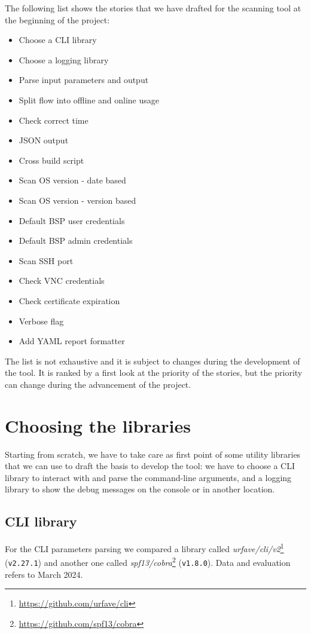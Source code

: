 The following list shows the stories that we have drafted for the scanning tool at the beginning of the project:
\begin{itemize}
  \item Choose a CLI library
  \item Choose a logging library
  \item Parse input parameters and output
  \item Split flow into offline and online usage
  \item Check correct time
  \item JSON output
  \item Cross build script
  \item Scan OS version - date based
  \item Scan OS version - version based
  \item Default BSP user credentials
  \item Default BSP admin credentials
  \item Scan SSH port
  \item Check VNC credentials
  \item Check certificate expiration
  \item Verbose flag
  \item Add YAML report formatter
\end{itemize}

The list is not exhaustive and it is subject to changes during the development of the tool. It is ranked by a first look at the priority of the stories, but the priority can change during the advancement of the project.

\section{Choosing the libraries}

Starting from scratch, we have to take care as first point of some utility libraries that we can use to draft the basis to develop the tool: we have to choose a CLI library to interact with and parse the command-line arguments, and a logging library to show the debug messages on the console or in another location.

\subsection{CLI library}

For the CLI parameters parsing we compared a library called \textit{urfave/cli/v2}\footnote{\url{https://github.com/urfave/cli}} (\texttt{v2.27.1}) and another one called \textit{spf13/cobra}\footnote{\url{https://github.com/spf13/cobra}} (\texttt{v1.8.0}). Data and evaluation refers to March 2024.

